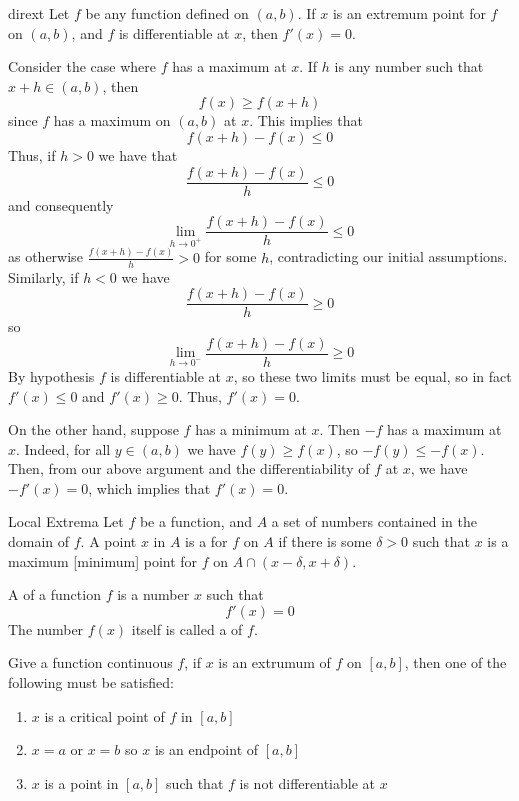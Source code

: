 \documentclass[12pt]{report}
\begin{document}
\begin{thm}{}{dirext}
    Let $f$ be any function defined on $(a,b)$. If $x$ is an extremum point for $f$ on $(a,b)$, and $f$ is differentiable at $x$, then $f'(x) = 0$.
\end{thm}
\begin{proof*}{}{}
    Consider the case where $f$ has a maximum at $x$. If $h$ is any number such that $x+h \in (a,b)$, then $$f(x) \geq f(x+h)$$
    since $f$ has a maximum on $(a,b)$ at $x$. This implies that $$f(x+h)-f(x) \leq 0$$
    Thus, if $h > 0$ we have that $$\frac{f(x+h) - f(x)}{h} \leq 0$$
    and consequently $$\lim\limits_{h\rightarrow 0^+}\frac{f(x+h)-f(x)}{h} \leq 0$$
    as otherwise $\frac{f(x+h) - f(x)}{h} > 0$ for some $h$, contradicting our initial assumptions. Similarly, if $h < 0$ we have $$\frac{f(x+h)-f(x)}{h} \geq 0$$
    so $$\lim\limits_{h\rightarrow 0^-}\frac{f(x+h)-f(x)}{h} \geq 0$$
    By hypothesis $f$ is differentiable at $x$, so these two limits must be equal, so in fact $f'(x) \leq 0$ and $f'(x) \geq 0$. Thus, $f'(x) = 0$.

    On the other hand, suppose $f$ has a minimum at $x$. Then $-f$ has a maximum at $x$. Indeed, for all $y \in (a,b)$ we have $f(y) \geq f(x)$, so $-f(y) \leq -f(x)$. Then, from our above argument and the differentiability of $f$ at $x$, we have $-f'(x) = 0$, which implies that $f'(x) = 0$.
\end{proof*}


\begin{defn}{Local Extrema}{}
    Let $f$ be a function, and $A$ a set of numbers contained in the domain of $f$. A point $x$ in $A$ is a  for $f$ on $A$ if there is some $\delta > 0$ such that $x$ is a maximum [minimum] point for $f$ on $A \cap(x-\delta,x+\delta)$.
\end{defn}


\begin{defn}{}{}
    A  of a function $f$ is a number $x$ such that \begin{equation}
        f'(x) = 0
    \end{equation}
    The number $f(x)$ itself is called a  of $f$.
\end{defn}

\begin{rmk}{}{}
    Give a function continuous $f$, if $x$ is an extrumum of $f$ on $[a,b]$, then one of the following must be satisfied: \begin{enumerate}
        \item $x$ is a critical point of $f$ in $[a,b]$
        \item $x = a$ or $x = b$ so $x$ is an endpoint of $[a,b]$
        \item $x$ is a point in $[a,b]$ such that $f$ is not differentiable at $x$
    \end{enumerate}
\end{rmk}
\end{document}
